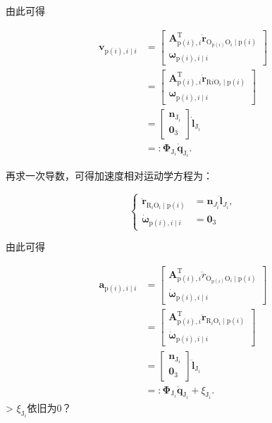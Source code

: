 由此可得

\[
\begin{aligned}
\boldsymbol{v}_{\mathrm{p}(i), i \mid i} & =\left[\begin{array}{c}
\boldsymbol{A}_{\mathrm{p}(i), i}^{\mathrm{T}} \dot{\boldsymbol{r}}_{\mathrm{O}_{\mathrm{p}(i)} \mathrm{O}_{i}\mid \mathrm{p}(i)}   \\
\boldsymbol{\omega}_{\mathrm{p}(i), i \mid i}
\end{array}\right] \\
& =\left[\begin{array}{c}
\boldsymbol{A}_{\mathrm{p}(i), i}^{\mathrm{T}} \dot{\boldsymbol{r}}_{\mathrm{R} i\mathrm{O}_{i} \mid \mathrm{p}(i) } \\
\boldsymbol{\omega}_{\mathrm{p}(i), i \mid i}
\end{array}\right] \\
& =\left[\begin{array}{c}
 \boldsymbol{n}_{\mathrm{J}_{i}}\\\mathbf{0}_{3}
\end{array}\right] \dot{\boldsymbol{l}}_{\mathrm{J}_{i}} \\
& =: \boldsymbol{\Phi}_{\mathrm{J}_{i}} \dot{\boldsymbol{q}}_{\mathrm{J}_{i}} .
\end{aligned}
\]

再求一次导数，可得加速度相对运动学方程为：

\[
\left\{\begin{aligned}
\ddot{\boldsymbol{r}}_{\mathrm{R}_{i} \mathrm{O}_{i} \mid \mathrm{p}(i)} & =\boldsymbol{n}_{J_{i}}\ddot{\boldsymbol{l}}_{J_{i}}, \\
\dot{\boldsymbol{\omega}}_{\mathrm{p}(i), i\mid i} & =\boldsymbol{0} _{3}
\end{aligned}\right.
\]

由此可得

\[
\begin{aligned}
\boldsymbol{a}_{\mathrm{p}(i), i \mid i} & =\left[\begin{array}{c}
\boldsymbol{A}_{\mathrm{p}(i), i}^{\mathrm{T}} \ddot{r}_{\mathrm{O}_{\mathrm{p}(i)} \mathrm{O}_{i} \mid \mathrm{p}(i)} \\
\dot{\boldsymbol{\omega}}_{\mathrm{p}(i), i \mid i}
\end{array}\right] \\
& =\left[\begin{array}{c}
\boldsymbol{A}_{\mathrm{p}(i), i}^{\mathrm{T}} \ddot{\boldsymbol{r}}_{\mathrm{R}_{i} \mathrm{O}_{i} \mid \mathrm{p}(i)} \\
\dot{\boldsymbol{\omega}}_{\mathrm{p}(i), i \mid i}
\end{array}\right] \\
& =\left[\begin{array}{c}
 \boldsymbol{n}_{\mathrm{J}_{i}}\\\mathbf{0}_{3}
\end{array}\right] \ddot{\boldsymbol{l}}_{\mathrm{J}_{i}}\\
& =: \boldsymbol{\Phi}_{\mathrm{J}_{i}} \ddot{\boldsymbol{q}}_{\mathrm{J}_{i}}+\xi_{\mathrm{J}_{i}} .
\end{aligned}
\]
> $\xi_{\mathrm{J}_{i}}$依旧为0？
